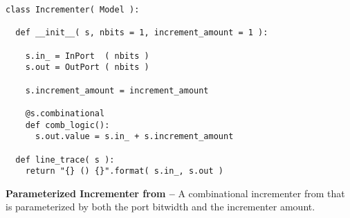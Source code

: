 

  \begin{lstlisting}[xleftmargin={0.9in}]
class Incrementer( Model ):

  def __init__( s, nbits = 1, increment_amount = 1 ):

    s.in_ = InPort  ( nbits )
    s.out = OutPort ( nbits )

    s.increment_amount = increment_amount

    @s.combinational
    def comb_logic():
      s.out.value = s.in_ + s.increment_amount

  def line_trace( s ):
    return "{} () {}".format( s.in_, s.out )
\end{lstlisting}

  \caption{\textbf{Parameterized Incrementer from  --} A
    combinational incrementer from  that is parameterized by
    both the port bitwidth and the incrementer amount.}
  \label{code-tut3-pclib-incr}


